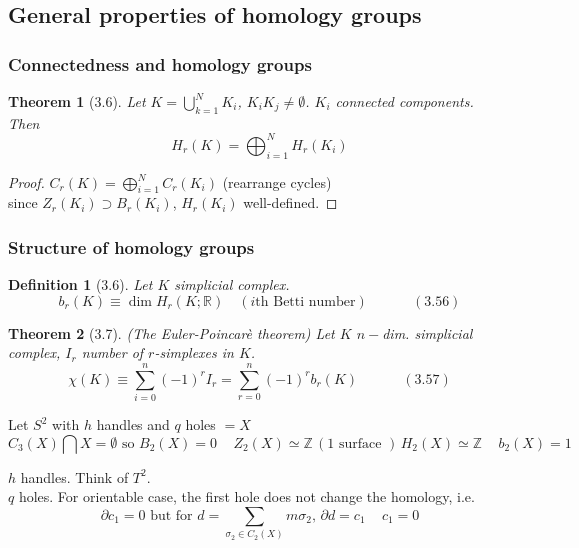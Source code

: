 \documentclass[twoside]{amsart}
\newtheorem{theorem}{Theorem}
\newtheorem{definition}{Definition}
\newcommand{\problemhead}[1]
  {\smallskip
   \noindent{\large\bf Problem #1.}
   }
\begin{document}
\subsection{General properties of homology groups}

\subsubsection{Connectedness and homology groups}

\begin{theorem}[3.6] Let $K  = \bigcup_{k=1}^N K_i$, $K_i K_j \neq \emptyset$.  $K_i$ connected components.  \\
Then 
\[
H_r(K) = \bigoplus_{i=1}^N H_r(K_i)
\]
\end{theorem}

\begin{proof}
  $C_r(K) = \bigoplus_{i=1}^N C_r(K_i)$ (rearrange cycles) \\
  since $Z_r(K_i) \supset B_r(K_i)$, $H_r(K_i)$ well-defined.  
\end{proof}

\subsubsection{Structure of homology groups}

\begin{definition}[3.6] Let $K$ simplicial complex.  
\begin{equation}
  b_r(K) \equiv \dim{H_r(K;\mathbb{R})} \quad (\text{$i$th Betti number}) \quad \quad \quad \, (3.56)
\end{equation}
\end{definition}

\begin{theorem}[3.7] (The Euler-Poincar\`{e} theorem) Let $K$ $n-$dim. simplicial complex, $I_r$ number of $r$-simplexes in $K$.  
\begin{equation}
  \chi(K) \equiv \sum_{i=0}^n (-1)^r I_r = \sum_{r=0}^n (-1)^r b_r(K) \quad \quad \quad \, (3.57)
\end{equation}
\end{theorem}

\problemhead{3.1}

Let $S^2$ with $h$ handles and $q$ holes $=X$ 
\[
C_3(X) \bigcap X= \emptyset \text{ so } B_2(X) = 0 \quad \, Z_2(X) \simeq \mathbb{Z} \, (1 \text{ surface }) \, \boxed{ H_2(X) \simeq \mathbb{Z} \quad \, b_2(X) = 1 }
\]

$h$ handles.  Think of $T^2$.  \\
$q$ holes.  For orientable case, the first hole does not change the homology, i.e.
\[
\partial c_1 =0 \text{ but for } d = \sum_{\sigma_2 \in C_2(X)} m\sigma_2, \, \partial d = c_1 \quad \, c_1 = 0
\]
\end{document}
